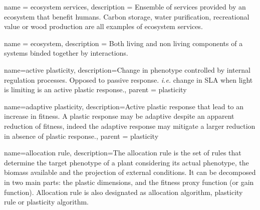 



{
name = ecosystem services,
description = {Ensemble of services provided by an ecosystem that benefit humans. Carbon storage, water purification, recreational value or wood production are all examples of ecosystem services.} 
}


{
name = ecosystem,
description = {Both living and non living components of a systems binded together by interactions.} 
}




{
    name=active plasticity,
    description={Change in phenotype controlled by internal regulation processes. Opposed to passive response. \textit{i.e.} change in SLA when light is limiting is an active plastic response.},
    parent = plasticity
    }


{
    name=adaptive plasticity,
    description={Active plastic response that lead to an increase in fitness. A plastic response may be adaptive despite an apparent reduction of fitness, indeed the adaptive response may mitigate a larger reduction in absence of plastic response.},
    parent = plasticity
    }

%

{
    name=allocation rule,
    description={The allocation rule is the set of rules that determine the target phenotype of a plant considering its actual phenotype, the biomass available and the projection of external conditions. It can be decomposed in two main parts: the plastic dimensions, and the fitness proxy function (or gain function). Allocation rule is also designated as allocation algorithm, plasticity rule or plasticity algorithm.}
}